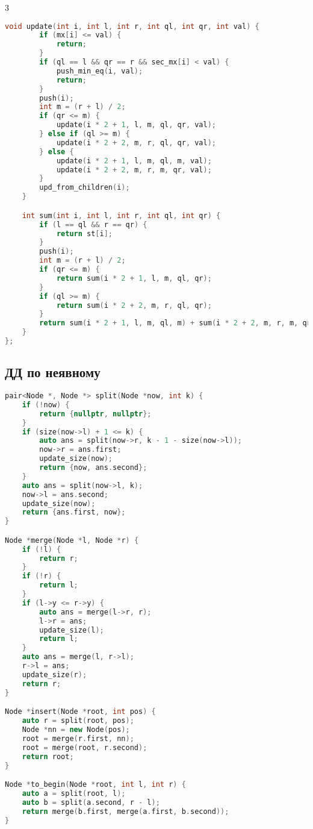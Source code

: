 \documentclass[10pt,a4paper,landscape,twosided]{extarticle}
\begin{document}
\begin{multicols}{3}
\begin{lstlisting}[language=C++]
    void update(int i, int l, int r, int ql, int qr, int val) {
        if (mx[i] <= val) {
            return;
        }
        if (ql == l && qr == r && sec_mx[i] < val) {
            push_min_eq(i, val);
            return;
        }
        push(i);
        int m = (r + l) / 2;
        if (qr <= m) {
            update(i * 2 + 1, l, m, ql, qr, val);
        } else if (ql >= m) {
            update(i * 2 + 2, m, r, ql, qr, val);
        } else {
            update(i * 2 + 1, l, m, ql, m, val);
            update(i * 2 + 2, m, r, m, qr, val);
        }
        upd_from_children(i);
    }

    int sum(int i, int l, int r, int ql, int qr) {
        if (l == ql && r == qr) {
            return st[i];
        }
        push(i);
        int m = (r + l) / 2;
        if (qr <= m) {
            return sum(i * 2 + 1, l, m, ql, qr);
        }
        if (ql >= m) {
            return sum(i * 2 + 2, m, r, ql, qr);
        }
        return sum(i * 2 + 1, l, m, ql, m) + sum(i * 2 + 2, m, r, m, qr);
    }
};
\end{lstlisting}

\subsection{ДД по неявному}
\begin{lstlisting}[language=C++]
pair<Node *, Node *> split(Node *now, int k) {
    if (!now) {
        return {nullptr, nullptr};
    }
    if (size(now->l) + 1 <= k) {
        auto ans = split(now->r, k - 1 - size(now->l));
        now->r = ans.first;
        update_size(now);
        return {now, ans.second};
    }
    auto ans = split(now->l, k);
    now->l = ans.second;
    update_size(now);
    return {ans.first, now};
}

Node *merge(Node *l, Node *r) {
    if (!l) {
        return r;
    }
    if (!r) {
        return l;
    }
    if (l->y <= r->y) {
        auto ans = merge(l->r, r);
        l->r = ans;
        update_size(l);
        return l;
    }
    auto ans = merge(l, r->l);
    r->l = ans;
    update_size(r);
    return r;
}

Node *insert(Node *root, int pos) {
    auto r = split(root, pos);
    Node *nn = new Node(pos);
    root = merge(r.first, nn);
    root = merge(root, r.second);
    return root;
}

Node *to_begin(Node *root, int l, int r) {
    auto a = split(root, l);
    auto b = split(a.second, r - l);
    return merge(b.first, merge(a.first, b.second));
}


\end{lstlisting}
\end{multicols}
\end{document}
